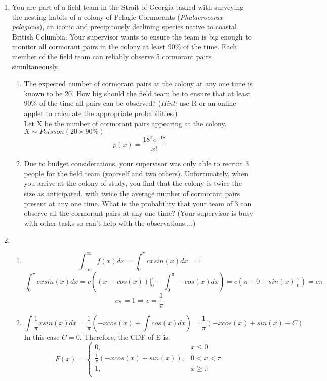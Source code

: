 \documentclass[11pt]{article}
\begin{document}
\begin{enumerate}[label=\textbf{Question \arabic*:},start=1]
\item You are part of a field team in the Strait of Georgia tasked with surveying the nesting habits of a colony of Pelagic Cormorants ({\em Phalacrocorax pelagicus}), an iconic and precipitously declining species native to coastal British Columbia. Your supervisor wants to ensure the team is big enough to monitor all cormorant pairs in the colony at least 90\% of the time. Each member of the field team can reliably observe 5 cormorant pairs simultaneously. 
\begin{enumerate}
\item The expected number of cormorant pairs at the colony at any one time is known to be 20. How big should the field team be to ensure that at least 90\% of the time all pairs can be observed? 
({\em Hint:} use R or an online applet to calculate the appropriate probabilities.)\\

Let X be the number of cormorant pairs appearing at the colony. \( X \sim Poisson(20 \times 90\%) \) \\
\[
p(x) = \frac{18^x e^{-18}}{x!}
\]

\item Due to budget considerations, your supervisor was only able to recruit 3 people for the field team (yourself and two others). Unfortunately, when you arrive at the colony of study, you find that the colony is twice the size as anticipated. with twice the average number of cormorant pairs present at any one time. What is the probability that your team of 3 can observe all the cormorant pairs at any one time? (Your supervisor is busy with other tasks so can't help with the observations....) 
\end{enumerate}




\item 
\begin{enumerate}
  \item 
\[
\int_{-\infty}^{\infty} f(x) dx = \int_{0}^{\pi} cx sin(x) dx = 1
\]
\[
 \int_{0}^{\pi} cx sin(x) dx = c( (x \cdot -cos(x))|_{0}^{\pi} - \int_{0}^{\pi} -cos(x)dx ) = c (\pi - 0 + sin(x) |_{0}^{\pi}) = c \pi
\]
\[
c \pi = 1 \Rightarrow c = \frac{1}{\pi}
\]

  \item 
\[
 \int \frac{1}{\pi} x sin(x) dx = \frac{1}{\pi}( -xcos(x) + \int cos(x)dx ) = \frac{1}{\pi} (-xcos(x) + sin(x) + C)
\]
In this case $C = 0$. Therefore, the CDF of E is:
\[
F(x) = \begin{cases}
        0, & x \leq 0\\
        \frac{1}{\pi} (-xcos(x) + sin(x)), & 0 < x < \pi\\
        1, & x \ge \pi\\
        \end{cases}
\]



\end{enumerate}
\end{enumerate}
\end{document}

